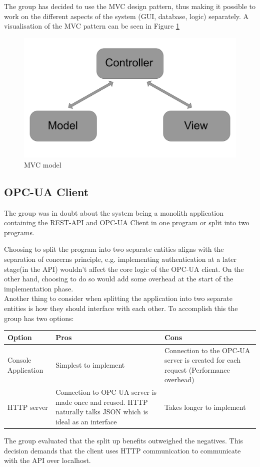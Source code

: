 The group has decided to use the MVC design pattern, thus making it possible to
work on the different aspects of the system (GUI, database, logic) separately. 
A visualisation of the MVC pattern can be seen in Figure \ref{figure:MVC_model}

\begin{figure}[H]
    \centering
    \includegraphics[scale=0.15]{images/MVC_model.png}
    \caption{MVC model}
    \label{figure:MVC_model}
\end{figure}

\subsection{OPC-UA Client}
The group was in doubt about the system being a monolith application containing 
the REST-API and OPC-UA Client in one program or split into two programs.

Choosing to split the program into two separate entities aligns with the 
separation of concerns principle, e.g. implementing authentication at a later 
stage(in the API) wouldn't affect the core logic of the OPC-UA client. On the 
other hand, choosing to do so would add some overhead at the start of the 
implementation phase. \\

Another thing to consider when splitting the application into two separate 
entities is how they should interface with each other. To accomplish this the 
group has two options: 

\begin{table}[ht]
    \begin{tabularx}{\textwidth}{|>{\RaggedRight}X|>{\RaggedRight}X|>{\RaggedRight}X|}
        \hline
        \textbf{Option} & \textbf{Pros} & \textbf{Cons} \\
        \hline
        Console Application & Simplest to implement & Connection to the OPC-UA 
        server is created for each request (Performance overhead)\\
        \hline
        HTTP server & Connection to OPC-UA server is made once and reused. HTTP
        naturally talks JSON which is ideal as an interface & Takes longer to 
        implement \\
        \hline
    \end{tabularx}
    \label{someLabel}
\end{table}

The group evaluated that the split up benefits outweighed the negatives. This 
decision demands that the client uses HTTP communication to communicate with the
API over localhost. 
